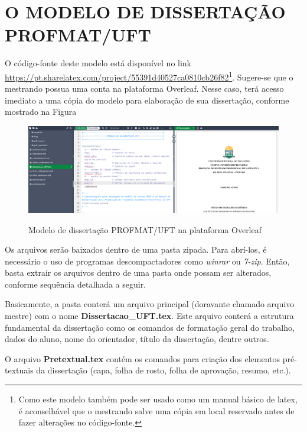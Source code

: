 
\chapter{O MODELO DE DISSERTAÇÃO PROFMAT/UFT}


O código-fonte deste modelo está disponível no link \url{https://pt.sharelatex.com/project/55391d40527ca0810cb26f82}\footnote{Como este modelo também pode ser usado como um manual básico de latex, é aconselhável que o mestrando salve uma cópia em local reservado antes de fazer alterações no código-fonte.}. Sugere-se que o mestrando possua uma conta na plataforma Overleaf. Nesse caso, terá acesso imediato a uma cópia do modelo para elaboração de sua dissertação, conforme mostrado na Figura

\begin{figure}[H]
    \centering
    \caption{Modelo de dissertação PROFMAT/UFT na plataforma Overleaf}
    \includegraphics[width=\textwidth]{img/modelo_dissertacao_01.png}
    \label{fig:modelo_dissertacao_01}
\end{figure}





Os arquivos serão baixados dentro de uma pasta zipada. Para abrí-los, é necessário o uso de programas descompactadores como \textit{winrar} ou \textit{7-zip}. Então, basta extrair os arquivos dentro de uma pasta onde possam ser alterados, conforme sequência detalhada a seguir.

Basicamente, a pasta conterá um arquivo principal (doravante chamado arquivo mestre) com o nome \textbf{Dissertacao\_UFT.tex}. Este arquivo conterá a estrutura fundamental da dissertação como os comandos de formatação geral do trabalho, dados do aluno, nome do orientador, título da dissertação, dentre outros.

O arquivo \textbf{Pretextual.tex} contém os comandos para criação dos elementos pré-textuais da dissertação (capa, folha de rosto, folha de aprovação, resumo, etc.). 

